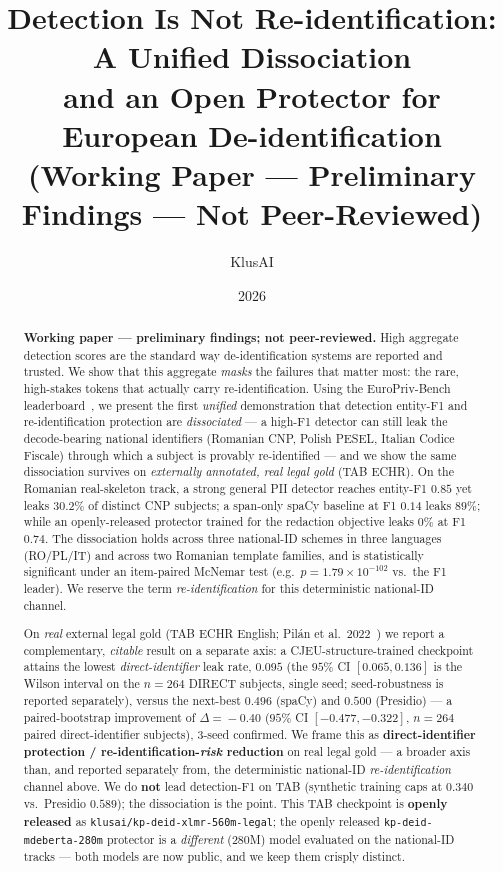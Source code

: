 \documentclass[11pt]{article}
\title{Detection Is Not Re-identification: A Unified Dissociation\\
       and an Open Protector for European De-identification\\
       \large (Working Paper --- Preliminary Findings --- Not Peer-Reviewed)}
\author{KlusAI}
\date{2026}
\begin{document}
\maketitle

\begin{abstract}
\noindent\textbf{Working paper --- preliminary findings; not peer-reviewed.} High aggregate detection scores are the
standard way de-identification systems are reported and trusted. We show that this aggregate
\emph{masks} the failures that matter most: the rare, high-stakes tokens that actually carry
re-identification. Using the EuroPriv-Bench leaderboard~\cite{europrivbench2026}, we present the
first \emph{unified} demonstration that detection entity-F1 and re-identification protection are
\emph{dissociated} --- a high-F1 detector can still leak the decode-bearing national identifiers
(Romanian CNP, Polish PESEL, Italian Codice Fiscale) through which a subject is provably
re-identified --- and we show the same dissociation survives on \emph{externally annotated, real
legal gold} (TAB ECHR). On the Romanian real-skeleton track, a strong general PII detector reaches
entity-F1 $0.85$ yet leaks $30.2\%$ of distinct CNP subjects; a span-only spaCy baseline at F1
$0.14$ leaks $89\%$; while an openly-released protector trained for the redaction objective leaks
$0\%$ at F1 $0.74$. The dissociation holds across three national-ID schemes in three languages
(RO/PL/IT) and across two Romanian template families, and is statistically significant under an
item-paired McNemar test (e.g.\ $p\!=\!1.79\!\times\!10^{-102}$ vs.\ the F1 leader). We reserve the
term \emph{re-identification} for this deterministic national-ID channel.

On \emph{real} external legal gold (TAB ECHR English; Pil\'an et al.\ 2022~\cite{pilan2022tab}) we
report a complementary, \emph{citable} result on a separate axis: a CJEU-structure-trained checkpoint
attains the lowest \emph{direct-identifier} leak rate, $0.095$ (the $95\%$ CI $[0.065,0.136]$ is the
Wilson interval on the $n{=}264$ DIRECT subjects, single seed; seed-robustness is reported
separately), versus
the next-best $0.496$ (spaCy) and $0.500$ (Presidio) --- a paired-bootstrap improvement of
$\Delta\!=\!-0.40$ ($95\%$ CI $[-0.477,-0.322]$, $n{=}264$ paired direct-identifier subjects),
3-seed confirmed. We frame this as \textbf{direct-identifier protection / re-identification-\emph{risk}
reduction} on real legal gold --- a broader axis than, and reported separately from, the deterministic
national-ID \emph{re-identification} channel above. We do \textbf{not} lead detection-F1 on TAB
(synthetic training caps at $0.340$ vs.\ Presidio $0.589$); the dissociation is the point. This TAB
checkpoint is \textbf{openly released} as \texttt{klusai/kp-deid-xlmr-560m-legal}; the openly
released \texttt{kp-deid-mdeberta-280m} protector is a \emph{different} (280M) model evaluated on the
national-ID tracks --- both models are now public, and we keep them crisply distinct.


\end{abstract}
\end{document}
